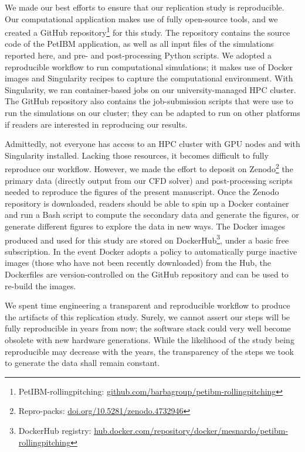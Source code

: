 We made our best efforts to ensure that our replication study is reproducible.
Our computational application makes use of fully open-source tools, and
we created a GitHub repository\footnote{PetIBM-rollingpitching: \url{github.com/barbagroup/petibm-rollingpitching}} for this study.
The repository contains the source code of the PetIBM application, as well as all input files of the simulations reported here, and pre- and post-processing Python scripts.
We adopted a reproducible workflow to run computational simulations; it makes use of Docker images and Singularity recipes to capture the computational environment.
With Singularity, we ran container-based jobs on our university-managed HPC cluster.
The GitHub repository also contains the job-submission scripts that were use to run the simulations on our cluster; they can be adapted to run on other platforms if readers are interested in reproducing our results.

Admittedly, not everyone has access to an HPC cluster with GPU nodes and with Singularity installed.
Lacking those resources, it becomes difficult to fully reproduce our workflow.
However, we made the effort to deposit on Zenodo\footnote{Repro-packs: \url{doi.org/10.5281/zenodo.4732946}} the primary data (directly output from our CFD solver) and post-processing scripts needed to reproduce the figures of the present manuscript.
Once the Zenodo repository is downloaded, readers should be able to spin up a Docker container and run a Bash script to compute the secondary data and generate the figures,
or generate different figures to explore the data in new ways.
The Docker images produced and used for this study are stored on DockerHub\footnote{DockerHub registry: \url{hub.docker.com/repository/docker/mesnardo/petibm-rollingpitching}}, under a basic free subscription.
In the event Docker adopts a policy to automatically purge inactive images (those who have not been recently downloaded) from the Hub, the Dockerfiles are version-controlled on the GitHub repository and can be used to re-build the images.

We spent time engineering a transparent and reproducible workflow to produce the artifacts of this replication study.
Surely, we cannot assert our steps will be fully reproducible in years from now; the software stack could very well become obsolete with new hardware generations.
While the likelihood of the study being reproducible may decrease with the years, the transparency of the steps we took to generate the data shall remain constant.
